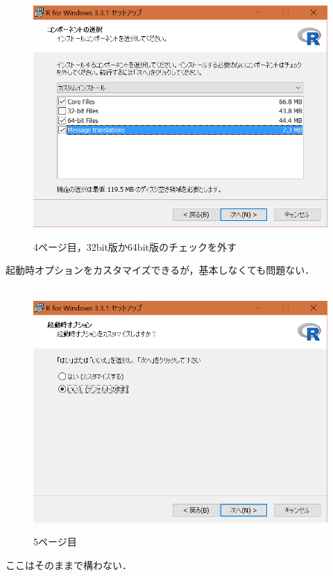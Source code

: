 \begin{figure}[!htbp]
\centering　
\includegraphics[width=13cm]{rinstall4.png}
\caption{4ページ目，32bit版か64bit版のチェックを外す}
\end{figure}

\newpage

起動時オプションをカスタマイズできるが，基本しなくても問題ない．

\begin{figure}[!htbp]
\centering　
\includegraphics[width=13cm]{rinstall5.png}
\caption{5ページ目}
\end{figure}

\newpage

ここはそのままで構わない．

